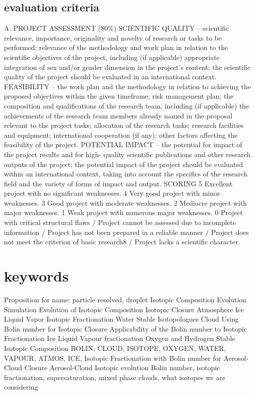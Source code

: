 \documentclass[11pt,a4paper]{article}
\begin{document}
\subsection{evaluation criteria}
A. PROJECT ASSESSMENT (80\%)
SCIENTIFIC QUALITY – scientific relevance, importance, originality and novelty of
research or tasks to be performed; relevance of the methodology and work plan in
relation to the scientific objectives of the project, including (if applicable) appropriate
integration of sex and/or gender dimension in the project’s content; the scientific
quality of the project should be evaluated in an international context.
FEASIBILITY – the work plan and the methodology in relation to achieving the
proposed objectives within the given timeframe; risk management plan; the
composition and qualifications of the research team, including (if applicable) the
achievements of the research team members already named in the proposal
relevant to the project tasks; allocation of the research tasks; research facilities and
equipment; international cooperation (if any); other factors affecting the feasibility of
the project.
POTENTIAL IMPACT – the potential for impact of the project results and for high-
quality scientific publications and other research outputs of the project; the potential
impact of the project should be evaluated within an international context, taking into
account the specifics of the research field and the variety of forms of impact and
output.
SCORING
5 Excellent project with no significant weaknesses.
4 Very good project with minor weaknesses.
3 Good project with moderate weaknesses.
2 Mediocre project with major weaknesses.
1 Weak project with numerous major weaknesses.
0 Project with critical structural flaws / Project cannot be assessed due to
incomplete information / Project has not been prepared in a reliable manner /
Project does not meet the criterion of basic research8 / Project lacks a scientific
character.

\section{keywords}
Proposition for name:
particle resolved, droplet
Isotopic Composition Evolution
Simulation Evolution of Isotopic Composition 
Isotopic Closure Atmosphere
Ice Liquid Vapor
Isotopic Fractionation
Water Stable Isotopologues
Cloud Using Bolin number for Isotopic Closure
Applicability of the Bolin number to Isotopic Fractionation
Ice Liquid Vapour fractionation Oxygen and Hydrogen
Stable Isotopic Composition
BOLIN, CLOUD, ISOTOPE, OXYGEN, WATER, VAPOUR, ATMOS, ICE, 
Isotopic Fractionation with Bolin number for Aerosol-Cloud Closure
Aerosol-Cloud Isotopic evolution
Bolin number, isotopic fractionation, supersaturation, mixed phase clouds, what isotopes we are considering
\end{document}
